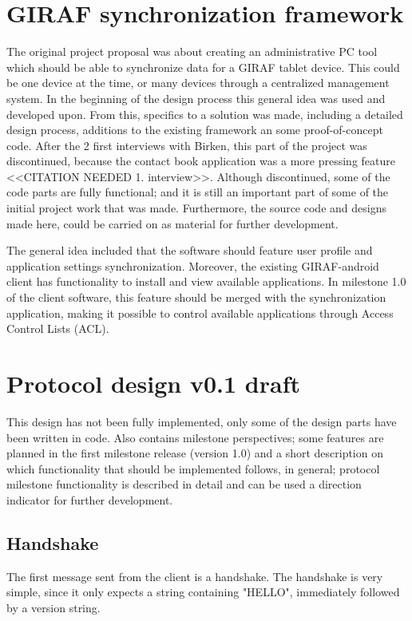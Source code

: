 \section{GIRAF synchronization framework}
The original project proposal was about creating an administrative PC tool which should be able to synchronize data for a GIRAF tablet device. This could be one device at the time, or many devices through a centralized management system. In the beginning of the design process this general idea was used and developed upon. From this, specifics to a solution was made, including a detailed design process, additions to the existing framework an some proof-of-concept code. After the 2 first interviews with Birken, this part of the project was discontinued, because the contact book application was a more pressing feature <<CITATION NEEDED 1. interview>>. Although discontinued, some of the code parts are fully functional; and it is still an important part of some of the initial project work that was made. Furthermore, the source code and designs made here, could be carried on as material for further development. 

The general idea included that the software should feature user profile and application settings synchronization. Moreover, the existing GIRAF-android client has functionality to install and view available applications. In milestone 1.0 of the client software, this feature should be merged with the synchronization application, making it possible to control available applications through Access Control Lists (ACL).

\section{Protocol design v0.1 draft}
This design has not been fully implemented, only some of the design parts have been written in code. Also contains milestone perspectives; some features are planned in the first milestone release (version 1.0) and a short description on which functionality that should be implemented follows, in general; protocol milestone functionality is described in detail and can be used a direction indicator for further development.  

\subsection{Handshake}
The first message sent from the client is a handshake. The handshake is very simple, since it only expects a string containing "HELLO", immediately followed by a version string.

